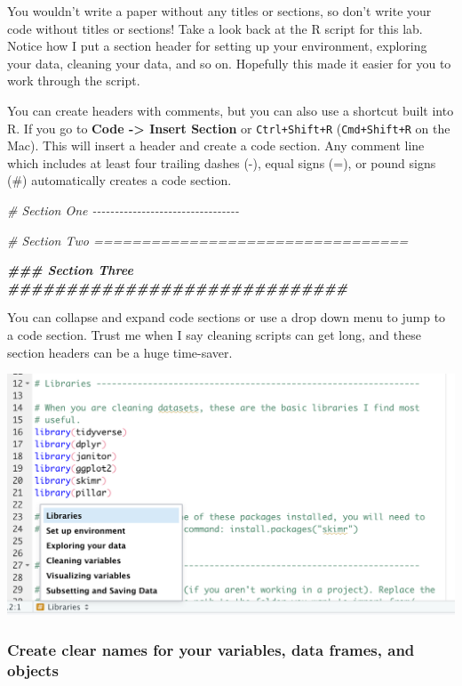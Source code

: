 \documentclass[
]{book}
\newenvironment{Shaded}{\begin{snugshade}}{\end{snugshade}}
\newcommand{\CommentTok}[1]{\textcolor[rgb]{0.56,0.35,0.01}{\textit{#1}}}
\newcommand{\DocumentationTok}[1]{\textcolor[rgb]{0.56,0.35,0.01}{\textbf{\textit{#1}}}}
\begin{document}
You wouldn't write a paper without any titles or sections, so don't write your code without titles or sections! Take a look back at the R script for this lab. Notice how I put a section header for setting up your environment, exploring your data, cleaning your data, and so on. Hopefully this made it easier for you to work through the script.

You can create headers with comments, but you can also use a shortcut built into R. If you go to \textbf{Code -\textgreater{} Insert Section} or \texttt{Ctrl+Shift+R} (\texttt{Cmd+Shift+R} on the Mac). This will insert a header and create a code section. Any comment line which includes at least four trailing dashes (-), equal signs (=), or pound signs (\#) automatically creates a code section.

\begin{Shaded}
\begin{Highlighting}[]
 \CommentTok{\# Section One {-}{-}{-}{-}{-}{-}{-}{-}{-}{-}{-}{-}{-}{-}{-}{-}{-}{-}{-}{-}{-}{-}{-}{-}{-}{-}{-}{-}{-}{-}{-}{-}{-}}
 
 \CommentTok{\# Section Two =================================}
 
 \DocumentationTok{\#\#\# Section Three \#\#\#\#\#\#\#\#\#\#\#\#\#\#\#\#\#\#\#\#\#\#\#\#\#\#\#\#\# }
\end{Highlighting}
\end{Shaded}

You can collapse and expand code sections or use a drop down menu to jump to a code section. Trust me when I say cleaning scripts can get long, and these section headers can be a huge time-saver.

\includegraphics[width=0.75\linewidth]{images/jumpmenu}

\hypertarget{create-clear-names-for-your-variables-data-frames-and-objects}{%
\subsubsection*{Create clear names for your variables, data frames, and objects}\label{create-clear-names-for-your-variables-data-frames-and-objects}}
\end{document}
